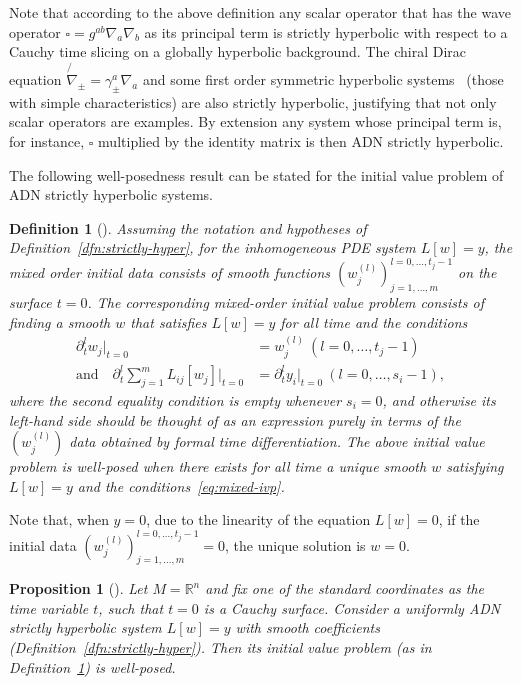 \documentclass[a4paper]{article}
\newtheorem{dfn}[thm]{Definition}
\newtheorem{prp}[thm]{Proposition}
\theoremstyle{remark}
\newcommand{\del}{\partial}
\begin{document}
Note that according to the above definition any scalar operator that has the
wave operator $\square = g^{ab} \nabla_a \nabla_b$ as its principal term is
strictly hyperbolic with respect to a Cauchy time slicing on a globally
hyperbolic background. The chiral Dirac equation $\not{\nabla}_\pm =
\gamma_\pm^a \nabla_a$ and some first order symmetric hyperbolic
systems~\cite[Def.10]{kh-chargeom} (those with simple characteristics) are also
strictly hyperbolic, justifying that not only scalar operators are examples.
By extension any system whose principal term is, for instance, $\square$
multiplied by the identity matrix is then ADN strictly hyperbolic.

The following well-posedness result can be stated for the initial value
problem of ADN strictly hyperbolic systems.
\begin{dfn}[{\cite[\textsection II.7.2.4]{gv-mixed}}] \label{dfn:mixed-ivp}
Assuming the notation and hypotheses of
Definition~\ref{dfn:strictly-hyper}, for the inhomogeneous PDE system
$L[w] = y$, the \emph{mixed order initial data} consists of smooth
functions $(w_j^{(l)})_{j=1,\ldots,m}^{l=0,\ldots,t_j-1}$ on the
surface $t=0$. The corresponding \emph{mixed-order initial value
problem} consists of finding a smooth $w$ that satisfies $L[w]=y$ for
all time and the conditions
\begin{equation} \label{eq:mixed-ivp}
\begin{aligned}
	\del_t^l w_j|_{t=0} &= w_j^{(l)}
		~ (l=0,\ldots,t_j-1)
	\\
	\text{and} \quad
	\del_t^l \sum_{j=1}^m L_{ij}[w_j]|_{t=0} &= \del_t^l y_i|_{t=0}
		~ (l=0,\ldots,s_i-1) ,
\end{aligned}
\end{equation}
where the second equality condition is empty whenever $s_i=0$, and
otherwise its left-hand side should be thought of as an expression
purely in terms of the $(w_j^{(l)})$ data obtained by formal time
differentiation. The above initial value problem is \emph{well-posed}
when there exists for all time a unique smooth $w$ satisfying $L[w]=y$
and the conditions~\eqref{eq:mixed-ivp}.
\end{dfn}

Note that, when $y=0$, due to the linearity of the equation $L[w] = 0$, if the
initial data $(w_j^{(l)})_{j=1,\ldots,m}^{l=0,\ldots,t_j-1} = 0$, the
unique solution is $w=0$.

\begin{prp}[{\cite[\textsection II.7.2.4]{gv-mixed}}] \label{prp:adn-well-posed}
Let $M = \mathbb{R}^n$ and fix one of the standard coordinates as the
time variable $t$, such that $t=0$ is a Cauchy surface. Consider a
uniformly ADN strictly hyperbolic system $L[w] = y$ with smooth
coefficients (Definition~\ref{dfn:strictly-hyper}). Then its initial
value problem (as in Definition~\ref{dfn:mixed-ivp}) is well-posed.
\end{prp}
\end{document}
